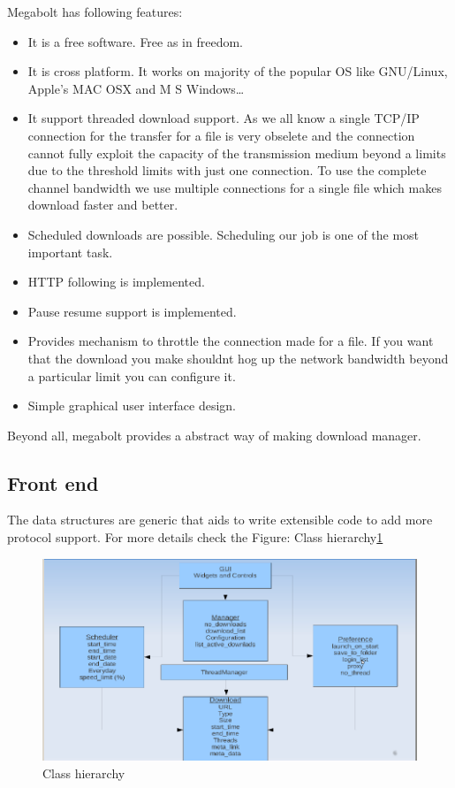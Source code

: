 \documentclass[pdftex,12pt,a4paper,pdfencoding=unicode]{article}
\begin{document}
\begin{onehalfspace}
       Megabolt has following features:
       \begin{itemize}
       \item It is a free software. Free as in freedom.
       \item It is cross platform. It works on majority of the popular OS like GNU/Linux, Apple's MAC OSX and M S Windows\ldots
       \item It support threaded download support. As we all know a single TCP/IP connection for the transfer for a file is very
         obselete and the connection cannot fully exploit the capacity of the transmission medium beyond a limits due to the threshold
         limits with just one connection. To use the complete channel bandwidth we use multiple connections for a single file which
         makes download faster and better.
       \item Scheduled downloads are possible. Scheduling our job is one of the most important task.
       \item HTTP following is implemented.
       \item Pause resume support is implemented.
       \item Provides mechanism to throttle the connection made for a file. If you want that the download you make shouldnt hog up
         the network bandwidth beyond a particular limit you can configure it.
       \item Simple graphical user interface design.
       \end{itemize}

       Beyond all, megabolt provides a abstract way of making download manager.

       \subsection{Front end}
       The data structures are generic that aids to write
       extensible code to add more protocol support. For more details check the Figure: Class hierarchy\ref{fig:hier}

       \begin{figure}[h!]
         \includegraphics[scale=0.50]{pic/hier.png}
         \caption{Class hierarchy \label{fig:hier}}
       \end{figure}


\end{onehalfspace}
\end{document}
